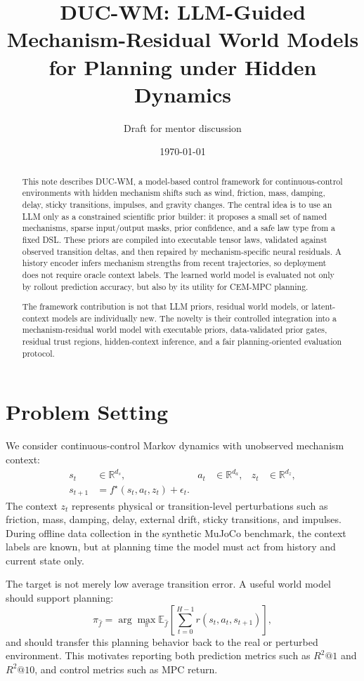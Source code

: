 \documentclass[11pt]{article}
\title{DUC-WM: LLM-Guided Mechanism-Residual World Models for Planning under Hidden Dynamics}
\author{Draft for mentor discussion}
\date{\today}
\newcommand{\R}{\mathbb{R}}
\newcommand{\E}{\mathbb{E}}
\begin{document}
\maketitle

\begin{abstract}
This note describes DUC-WM, a model-based control framework for continuous-control environments with hidden mechanism shifts such as wind, friction, mass, damping, delay, sticky transitions, impulses, and gravity changes. The central idea is to use an LLM only as a constrained scientific prior builder: it proposes a small set of named mechanisms, sparse input/output masks, prior confidence, and a safe law type from a fixed DSL. These priors are compiled into executable tensor laws, validated against observed transition deltas, and then repaired by mechanism-specific neural residuals. A history encoder infers mechanism strengths from recent trajectories, so deployment does not require oracle context labels. The learned world model is evaluated not only by rollout prediction accuracy, but also by its utility for CEM-MPC planning.

The framework contribution is not that LLM priors, residual world models, or latent-context models are individually new. The novelty is their controlled integration into a mechanism-residual world model with executable priors, data-validated prior gates, residual trust regions, hidden-context inference, and a fair planning-oriented evaluation protocol.
\end{abstract}

\section{Problem Setting}

We consider continuous-control Markov dynamics with unobserved mechanism context:
\begin{align}
    s_t &\in \R^{d_s}, &
    a_t &\in \R^{d_a}, &
    z_t &\in \R^{d_z}, \\
    s_{t+1} &= f^\star(s_t,a_t,z_t) + \epsilon_t.
\end{align}
The context $z_t$ represents physical or transition-level perturbations such as friction, mass, damping, delay, external drift, sticky transitions, and impulses. During offline data collection in the synthetic MuJoCo benchmark, the context labels are known, but at planning time the model must act from history and current state only.

The target is not merely low average transition error. A useful world model should support planning:
\begin{equation}
    \pi_{\hat f}
    =
    \arg\max_{\pi}
    \E_{\hat f}
    \left[
        \sum_{t=0}^{H-1} r(s_t,a_t,s_{t+1})
    \right],
\end{equation}
and should transfer this planning behavior back to the real or perturbed environment. This motivates reporting both prediction metrics such as $R^2@1$ and $R^2@10$, and control metrics such as MPC return.
\end{document}
